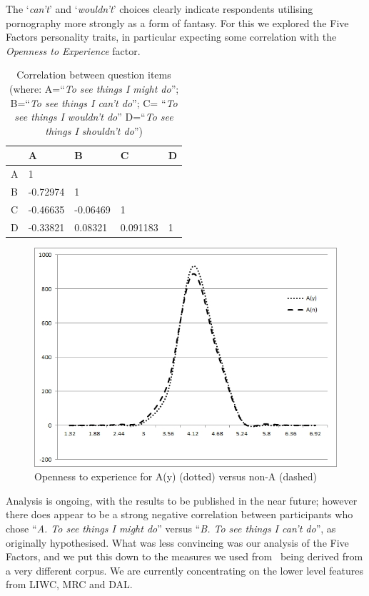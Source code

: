 \documentclass{AISB2008}
\begin{document}
The `{\emph{can't}}' and `{\emph{wouldn't}}' choices clearly indicate
respondents utilising pornography more strongly as a form of
fantasy. For this we explored the Five Factors personality traits, in
particular expecting some correlation with the {\emph{Openness to
Experience}} factor.

\begin{table}
\centering
\begin{tabularx}{\columnwidth}{l Y Y Y Y}
\hline
& A & B & C & D\\ 
\hline
A & 1 &  & & \\
B & -0.72974 & 1 & & \\
C & -0.46635 & -0.06469 & 1 & \\
D & -0.33821 & 0.08321 & 0.091183 & 1\\
\hline
\end{tabularx}
\caption{Correlation between question items (where: A=``{\emph{To
see things I might do}}''; B=``{\emph{To see things I can't do}}''; C=
``{\emph{To see things I wouldn't do}}'' D=``{\emph{To see
things I shouldn't do}}'')}
\label{tbl:abcd}
\end{table}


\begin{figure}[!hp]
\centering
\includegraphics[width=\columnwidth]{images/openA.jpg}
\caption{Openness to experience for A(y) (dotted) versus non-A (dashed)}
\label{fig:openA}
\end{figure}

Analysis is ongoing, with the results to be published in the near
future; however there does appear to be a strong negative correlation
between participants who chose ``{\emph{A. To see things I might
do}}'' versus ``{\emph{B. To see things I can't do}}'', as originally
hypothesised. What was less convincing was our analysis of the Five
Factors, and we put this down to the measures we used
from~\cite{mairesse-et-al:2007} being derived from a very different
corpus. We are currently concentrating on the lower level features
from LIWC, MRC and DAL.
\end{document}

